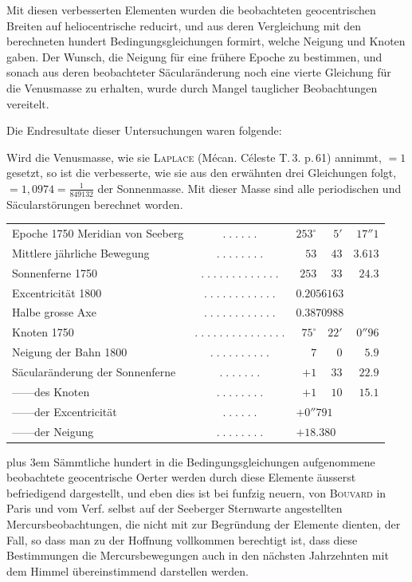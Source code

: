 Mit diesen verbesserten Elementen wurden die beobachteten geocentrischen Breiten auf heliocentrische reducirt, und aus deren Vergleichung mit den berechneten hundert Bedingungsgleichungen formirt, welche Neigung und Knoten gaben. Der Wunsch, die Neigung für eine frühere Epoche zu bestimmen, und sonach aus deren beobachteter Säcularänderung noch eine vierte Gleichung für die Venusmasse zu erhalten, wurde durch Mangel tauglicher Beobachtungen vereitelt.

Die Endresultate dieser Untersuchungen waren folgende:

Wird die Venusmasse, wie sie \textsc{Laplace} (Mécan. Céleste T.\,3. p.\,61) annimmt, $= 1$ gesetzt, so ist die verbesserte, wie sie aus den erwähnten drei Gleichungen folgt, $= 1{,}0974 = \frac{1}{849132}$ der Sonnenmasse. Mit dieser Masse sind alle periodischen und Säcularstörungen berechnet worden.

\begin{center}\fontsize{9}{11}\selectfont\setlength{\tabcolsep}{2pt}\renewcommand{\arraystretch}{1.18}\begin{tabular}{@{}l c r@{\;}r@{\;}r@{}}
Epoche 1750 Meridian von Seeberg & $.\;.\;.\;.\;.\;.$ & $253^\circ$ & $5'$ & $17''1$\\
Mittlere jährliche Bewegung & $.\;.\;.\;.\;.\;.\;.\;.$ & $53$ & $43$ & $3.613$\\
Sonnenferne 1750 & $.\;.\;.\;.\;.\;.\;.\;.\;.\;.\;.\;.\;.$ & $253$ & $33$ & $24.3$\\
Excentricität 1800 & $.\;.\;.\;.\;.\;.\;.\;.\;.\;.\;.\;.$ & \multicolumn{3}{l}{$0.2056163$}\\
Halbe grosse Axe & $.\;.\;.\;.\;.\;.\;.\;.\;.\;.\;.\;.$ & \multicolumn{3}{l}{$0.3870988$}\\
Knoten 1750 & $.\;.\;.\;.\;.\;.\;.\;.\;.\;.\;.\;.\;.\;.\;.$ & $75^\circ$ & $22'$ & $0''96$\\
Neigung der Bahn 1800 & $.\;.\;.\;.\;.\;.\;.\;.\;.\;.$ & $7$ & $0$ & $5.9$\\
Säcularänderung der Sonnenferne & $.\;.\;.\;.\;.\;.\;.$ & $+1$ & $33$ & $22.9$\\
\quad —\quad —\quad des Knoten & $.\;.\;.\;.\;.\;.\;.\;.$ & $+1$ & $10$ & $15.1$\\
\quad —\quad —\quad der Excentricität & $.\;.\;.\;.\;.\;.$ & \multicolumn{3}{l}{$+0''791$}\\
\quad —\quad —\quad der Neigung & $.\;.\;.\;.\;.\;.\;.\;.$ & \multicolumn{3}{l}{$+18.380$}\\
\end{tabular}\end{center}

{\rightskip=0pt plus 3em Sämmtliche hundert in die Bedingungsgleichungen aufgenommene beobachtete geocentrische Oerter werden durch diese Elemente äusserst befriedigend dargestellt, und eben dies ist bei funfzig neuern, von \textsc{Bouvard} in Paris und vom Verf. selbst auf der Seeberger Sternwarte angestellten Mercursbeobachtungen, die nicht mit zur Begründung der Elemente dienten, der Fall, so dass man zu der Hoffnung vollkommen berechtigt ist, dass diese Bestimmungen die Mercursbewegungen auch in den nächsten Jahrzehnten mit dem Himmel übereinstimmend darstellen werden.\par}
